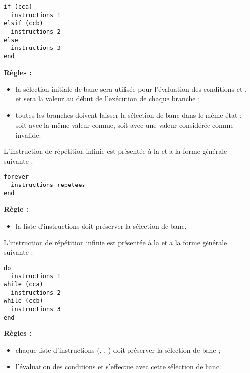 \begin{lstlisting}[language=piccolo]
if (cca)
  instructions 1
elsif (ccb)
  instructions 2
else
  instructions 3
end
\end{lstlisting}

\textbf{Règles :}
\begin{itemize}
  \item la sélection initiale de banc sera utilisée pour l’évaluation des conditions  et , et sera la valeur au début de l'exécution de chaque branche ;
  \item toutes les branches doivent laisser la sélection de banc dans le même état : soit avec la même valeur connue, soit avec une valeur considérée comme invalide.
\end{itemize}



L'instruction de répétition infinie est présentée à la  et a la forme générale suivante :

\begin{lstlisting}[language=piccolo]
forever
  instructions_repetees
end
\end{lstlisting}

\textbf{Règle :}
\begin{itemize}
  \item la liste d'instructions  doit préserver la sélection de banc.
\end{itemize}




L'instruction de répétition infinie est présentée à la  et a la forme générale suivante :

\begin{lstlisting}[language=piccolo]
do
  instructions 1
while (cca)
  instructions 2
while (ccb)
  instructions 3
end
\end{lstlisting}

\textbf{Règles :}
\begin{itemize}
  \item chaque liste d'instructions (, , ) doit préserver la sélection de banc ;
  \item l'évaluation des conditions  et  s'effectue avec cette sélection de banc.
\end{itemize}

